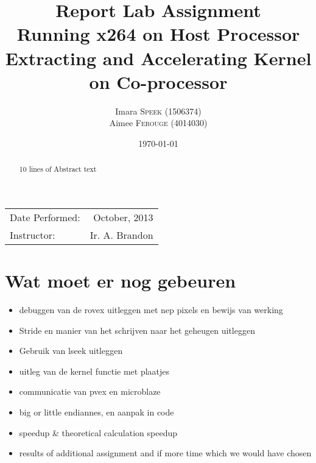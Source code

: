 \documentclass{article}
\title{Report Lab Assignment \\ Running x264 on Host Processor\\ Extracting and Accelerating Kernel on Co-processor} %
\author{Imara \textsc{Speek} (1506374)\\ Aimee \textsc{Ferouge} (4014030)} %
\date{\today} %
\begin{document}
\maketitle %

\begin{center}
\begin{tabular}{l r}
Date Performed: & October, 2013 \\ %
Instructor: & Ir. A. Brandon %
\end{tabular}
\end{center}

 \begin{abstract}
 10 lines of Abstract text
 \end{abstract}


\section{Wat moet er nog gebeuren}
\begin{itemize}
\item debuggen van de rovex uitleggen met nep pixels en bewijs van werking
\item Stride en manier van het schrijven naar het geheugen uitleggen
\item Gebruik van lseek uitleggen
\item uitleg van de kernel functie met plaatjes
\item communicatie van pvex en microblaze
\item big or little endiannes, en aanpak in code
\item speedup \& theoretical calculation speedup
\item results of additional assignment and if more time which we would have chosen
\end{itemize}



 




\appendix


%
%
%
%
%
\end{document}
